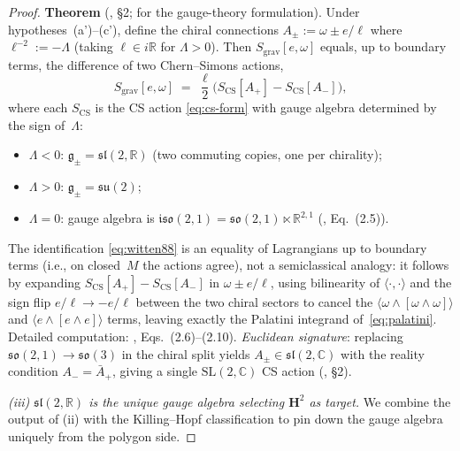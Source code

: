 \begin{proof}
\textbf{Theorem} (\citealt{Witten1988}, \S2;
\citealt{AchucarroTownsend1986} for the gauge-theory
formulation).  Under hypotheses~(a')--(c'), define
the chiral connections
$A_\pm := \omega \pm e/\ell$ where $\ell^{-2} := -\Lambda$
(taking $\ell \in i\mathbb{R}$ for $\Lambda > 0$).
Then $S_{\mathrm{grav}}[e,\omega]$ equals, up to boundary
terms, the difference of two Chern--Simons actions,
\begin{equation}\label{eq:witten88}
  S_{\mathrm{grav}}[e, \omega]
  \;=\; \frac{\ell}{2}\bigl(S_{\mathrm{CS}}[A_+]
    - S_{\mathrm{CS}}[A_-]\bigr),
\end{equation}
where each $S_{\mathrm{CS}}$ is the CS action
\eqref{eq:cs-form} with gauge algebra determined by
the sign of~$\Lambda$:
\begin{itemize}[leftmargin=*,topsep=0pt,itemsep=0pt]
\item $\Lambda < 0$: $\mathfrak{g}_\pm = \mathfrak{sl}(2,\mathbb{R})$
  (two commuting copies, one per chirality);
\item $\Lambda > 0$: $\mathfrak{g}_\pm = \mathfrak{su}(2)$;
\item $\Lambda = 0$: gauge algebra is
  $\mathfrak{iso}(2,1) = \mathfrak{so}(2,1) \ltimes \mathbb{R}^{2,1}$
  (\citealt{Witten1988}, Eq.~(2.5)).
\end{itemize}
The identification \eqref{eq:witten88} is an equality
of Lagrangians up to boundary terms (i.e., on closed~$M$
the actions agree), not a semiclassical analogy: it
follows by expanding $S_{\mathrm{CS}}[A_+] - S_{\mathrm{CS}}[A_-]$
in $\omega \pm e/\ell$, using bilinearity of
$\langle\cdot,\cdot\rangle$ and the sign flip
$e/\ell \to -e/\ell$ between the two chiral
sectors to cancel the
$\langle\omega\wedge[\omega\wedge\omega]\rangle$ and
$\langle e\wedge[e\wedge e]\rangle$ terms, leaving exactly
the Palatini integrand of~\eqref{eq:palatini}.
Detailed computation: \citealt{Witten1988}, Eqs.~(2.6)--(2.10).
\emph{Euclidean signature}: replacing
$\mathfrak{so}(2,1) \to \mathfrak{so}(3)$ in the chiral
split yields $A_\pm \in \mathfrak{sl}(2,\mathbb{C})$ with
the reality condition $A_- = \bar A_+$, giving a single
$\mathrm{SL}(2,\mathbb{C})$ CS action
(\citealt{Witten1991}, \S2).

\emph{(iii) $\mathfrak{sl}(2,\mathbb{R})$ is the unique
gauge algebra selecting $\mathbf{H}^2$ as target.}
We combine the output of (ii) with the
Killing--Hopf classification to pin down the gauge algebra
uniquely from the polygon side.


\end{proof}
